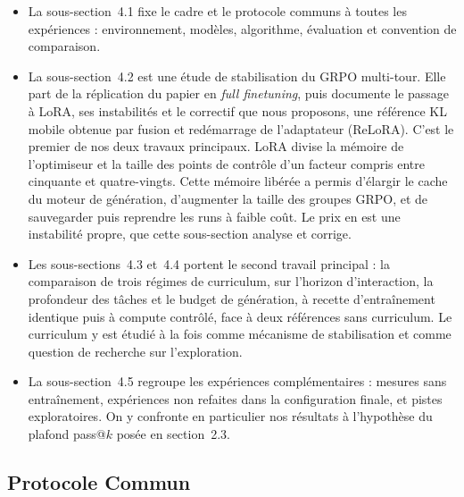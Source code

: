 \documentclass[11pt,a4paper]{article}
\begin{document}
\begin{itemize}
    \item La sous-section~4.1 fixe le cadre et le protocole communs à toutes les expériences : environnement, modèles, algorithme, évaluation et convention de comparaison.
    \item La sous-section~4.2 est une étude de stabilisation du GRPO multi-tour. Elle part de la réplication du papier en \emph{full finetuning}, puis documente le passage à LoRA, ses instabilités et le correctif que nous proposons, une référence KL mobile obtenue par fusion et redémarrage de l'adaptateur (ReLoRA). C'est le premier de nos deux travaux principaux. LoRA divise la mémoire de l'optimiseur et la taille des points de contrôle d'un facteur compris entre cinquante et quatre-vingts. Cette mémoire libérée a permis d'élargir le cache du moteur de génération, d'augmenter la taille des groupes GRPO, et de sauvegarder puis reprendre les runs à faible coût. Le prix en est une instabilité propre, que cette sous-section analyse et corrige.
    \item Les sous-sections~4.3 et~4.4 portent le second travail principal : la comparaison de trois régimes de curriculum, sur l'horizon d'interaction, la profondeur des tâches et le budget de génération, à recette d'entraînement identique puis à compute contrôlé, face à deux références sans curriculum. Le curriculum y est étudié à la fois comme mécanisme de stabilisation et comme question de recherche sur l'exploration.
    \item La sous-section~4.5 regroupe les expériences complémentaires : mesures sans entraînement, expériences non refaites dans la configuration finale, et pistes exploratoires. On y confronte en particulier nos résultats à l'hypothèse du plafond pass@$k$ posée en section~2.3.
\end{itemize}





\vspace{2cm}

\subsection{Protocole Commun}\label{subsec:protocole}
\end{document}
